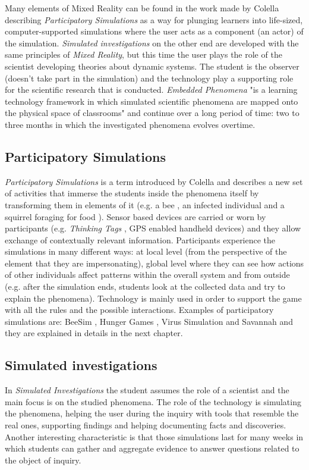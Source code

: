 Many elements of Mixed Reality can be found in the work made by Colella \cite{colella:virus} describing \textit{Participatory Simulations} as a way for plunging learners into life-sized, computer-supported simulations where the user acts as a component (an actor) of the simulation. \textit{Simulated investigations} on the other end are developed with the same principles of \textit{Mixed Reality}, but this time the user plays the role of the scientist developing theories about dynamic systems. The student is the observer (doesn't take part in the simulation) and the technology play a supporting role for the scientific research that is conducted. \textit{Embedded Phenomena} "is a learning technology framework in which simulated scientific phenomena are mapped onto the physical space of classrooms" \cite{moher:embedded} and continue over a long period of time: two to three months in which the investigated phenomena evolves overtime.

\subsection{Participatory Simulations}
\textit{Participatory Simulations} is a term introduced by Colella \cite{colella:virus} and describes a new set of activities that immerse the students inside the phenomena itself by transforming them in elements of it (e.g. a bee \cite{peppler:beesim}, an infected individual \cite{colella:virus} and a squirrel foraging for food \cite{gnoli:hunger_games}). Sensor based devices are carried or worn by participants (e.g. \textit{Thinking Tags} \cite{colella:virus}, GPS enabled handheld devices) and they allow exchange of contextually relevant information. Participants experience the simulations in many different ways: at local level (from the perspective of the element that they are impersonating), global level where they can see how actions of other individuals affect patterns within the overall system and from outside (e.g. after the simulation ends, students look at the collected data and try to explain the phenomena). Technology is mainly used in order to support the game with all the rules and the possible interactions. Examples of participatory simulations are: BeeSim \cite{peppler:beesim}, Hunger Games \cite{gnoli:hunger_games}, Virus Simulation \cite{colella:virus} and Savannah \cite{facer:savannah} and they are explained in details in the next chapter.

\subsection{Simulated investigations}
In \textit{Simulated Investigations} the student assumes the role of a scientist and the main focus is on the studied phenomena. The role of the technology is simulating the phenomena, helping the user during the inquiry with tools that resemble the real ones, supporting findings and helping documenting facts and discoveries. Another interesting characteristic is that those simulations last for many weeks in which students can gather and aggregate evidence to answer questions related to the object of inquiry.

